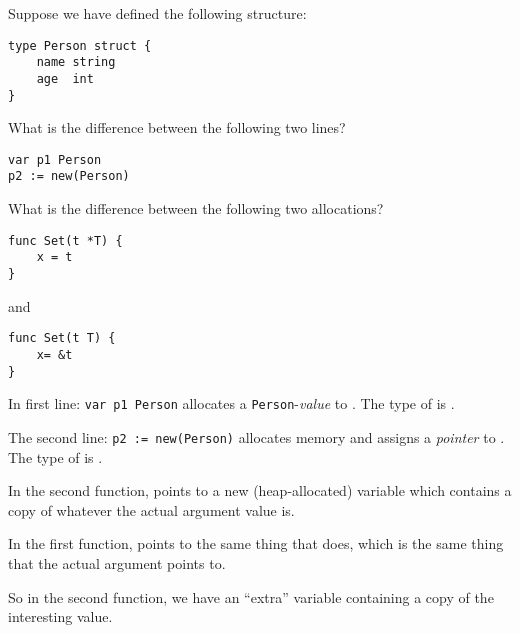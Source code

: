 \begin{Exercise}[title={Pointers},difficulty=1]
\label{ex:pointers}

\Question
Suppose we have defined the following structure:
\begin{lstlisting}
type Person struct {
    name string
    age	 int
}
\end{lstlisting}

What is the difference between the following two lines?
\begin{lstlisting}
var p1 Person
p2 := new(Person)
\end{lstlisting}

\Question
What is the difference between the following two allocations?
\begin{lstlisting}[numbers=none]
func Set(t *T) {
    x = t
}
\end{lstlisting}
and
\begin{lstlisting}[numbers=none]
func Set(t T) {
    x= &t
}
\end{lstlisting}
\end{Exercise}

\begin{Answer}
\Question
In first line: \lstinline{var p1 Person} allocates a
\texttt{Person}-\emph{value} to . The type of  is
.

The second line: \lstinline{p2 := new(Person)} allocates memory
and assigns a \emph{pointer} to . The type of  is
.

\Question
In the second function,  points to a new
(heap-allocated) variable  which contains
a copy of whatever the actual argument value is.

In the first function,  points to the same thing
that  does, which is the same thing that the actual
argument points to.

So in the second function, we have an ``extra'' variable
containing a copy of the interesting value.
\end{Answer}
